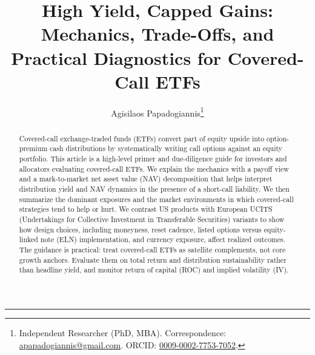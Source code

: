 \documentclass[12pt]{article}
\title{\vspace{-3.5em}High Yield, Capped Gains: Mechanics, Trade-Offs, and Practical Diagnostics for Covered-Call ETFs}
\author{Agisilaos Papadogiannis\thanks{Independent Researcher (PhD, MBA). Correspondence: \href{mailto:apapadogiannis@gmail.com}{apapadogiannis@gmail.com}. ORCID: \href{https://orcid.org/0009-0002-7753-7052}{0009-0002-7753-7052}.}}
\date{}
\begin{document}
\maketitle
\begin{abstract}
Covered-call exchange-traded funds (ETFs) convert part of equity upside into option-premium cash distributions by systematically writing call options against an equity portfolio. This article is a high-level primer and due-diligence guide for investors and allocators evaluating covered-call ETFs. We explain the mechanics with a payoff view and a mark-to-market net asset value (NAV) decomposition that helps interpret distribution yield and NAV dynamics in the presence of a short-call liability. We then summarize the dominant exposures and the market environments in which covered-call strategies tend to help or hurt. We contrast US products with European UCITS (Undertakings for Collective Investment in Transferable Securities) variants to show how design choices, including moneyness, reset cadence, listed options versus equity-linked note (ELN) implementation, and currency exposure, affect realized outcomes. The guidance is practical: treat covered-call ETFs as satellite complements, not core growth anchors. Evaluate them on total return and distribution sustainability rather than headline yield, and monitor return of capital (ROC) and implied volatility (IV).
\end{abstract}

\vspace{0.8em}
\noindent\rule{\textwidth}{0.4pt}
\end{document}
